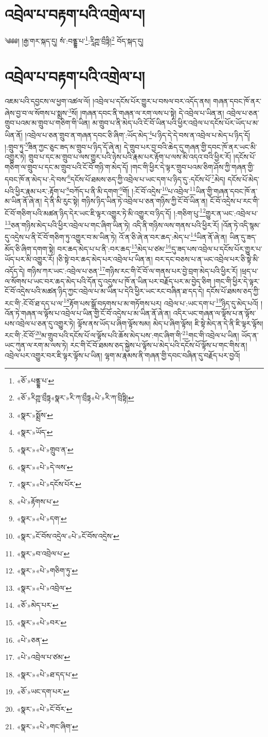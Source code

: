 \chapter{འབྲེལ་པ་བརྟག་པའི་འགྲེལ་པ།}༄༅༅། །རྒྱ་གར་སྐད་དུ། སཾ་:བནྡྷ་པ་\footnote{«ཅོ་»པནྡྷ་པ་}:རཱིཀྵ་བྲྀཏྟི།\footnote{«ཅོ་»རིཀྵ་བྲྀཏྟ«སྣར་»རི་ཀ་བྲྀཏྟ«པེ་»རི་ཀ་བྲིཏྟི།} བོད་སྐད་དུ། \chapter{འབྲེལ་པ་བརྟག་པའི་འགྲེལ་པ།} འཇམ་པའི་དབྱངས་ལ་ཕྱག་འཚལ་ལོ། །འབྲེལ་པ་དངོས་པོར་གྱུར་པ་བསལ་བར་འདོད་ནས། གཞན་དབང་ཁོ་ནར་ཞེས་བྱ་བ་ལ་སོགས་པ་སྨྲས་\footnote{«སྣར་»སྨྲོས་}སོ། །གཞན་དབང་ནི་གཞན་ལ་རག་ལས་པ་སྟེ། དེ་འབྲེལ་པ་ཡིན་ན། འབྲེལ་པ་ཅན་གྲུབ་པའམ་མ་གྲུབ་པ་གཅིག་གི་ཡིན། མ་གྲུབ་པ་ནི་མེད་པའི་ངོ་བོ་ཡིན་པའི་ཕྱིར་འབྲེལ་པ་དངོས་པོར་ཡོད་པ་མ་ཡིན་ནོ། །འབྲེལ་པ་ཅན་གྲུབ་ན་གཞན་དབང་ཅི་ཞིག་:ཡོད་མེད་\footnote{«སྣར་»ཡོད་}པ་ཉིད་དེ་དེ་བས་ན་འབྲེལ་པ་མེད་པ་ཉིད་དོ། །:གྲུབ་ཏུ་\footnote{«སྣར་»«པེ་»གྲུབ་ན་}ཟིན་ཀྱང་ཅུང་ཟད་མ་གྲུབ་པ་ཉིད་དོ་ཞེ་ན། དེ་གྲུབ་པར་བྱ་བའི་ཆེད་དུ་གཞན་གྱི་དབང་ཁོ་ནར་ཡང་མི་འགྱུར་ཏེ། གྲུབ་པ་དང་མ་གྲུབ་པ་ལས་གྱུར་པའི་ཉེས་པའི་རྣམ་པར་རྟོག་པ་ལས་མི་འདའ་བའི་ཕྱིར་རོ། །དངོས་པོ་གཅིག་ལ་གྲུབ་པ་དང་མ་གྲུབ་པའི་ངོ་བོ་གཉི་ག་མེད་དོ། །གང་གི་ཕྱིར་དེ་ལྟར་གྲུབ་པའམ་ཅིག་ཤོས་ཀྱི་གཞན་གྱི་དབང་ཁོ་ན་མེད་པ་:དེ་བས་\footnote{«སྣར་»«པེ་»དེ་ལས་}དངོས་པོ་ཐམས་ཅད་ཀྱི་འབྲེལ་པ་ཡང་དག་པ་ཉིད་དུ་:དངོས་པོ་\footnote{«སྣར་»«པེ་»དངོས་པོར་}མེད། དངོས་པོ་མེད་པའི་ཕྱིར་རྣམ་པར་:རྟོག་པ་\footnote{«པེ་»རྟོགས་པ་}བཀོད་པ་ནི་མི་དགག་\footnote{«སྣར་»«པེ་»དག་}གོ། །:ངོ་བོ་འདྲེས་\footnote{«སྣར་»ངོ་བོས་འདྲེལ་«པེ་»ངོ་བོས་འདྲེས་}པ་འབྲེལ་\footnote{«སྣར་»བ་འབྲེལ་པ་}ཡིན་གྱི་གཞན་དབང་ཁོ་ན་མ་ཡིན་ནོ་ཞེ་ན། དེ་ནི་མི་རུང་སྟེ། གཉིས་ཉིད་ཡིན་ཏེ་འབྲེལ་པ་ཅན་གཉིས་ཀྱི་ངོ་བོ་ཡིན་ན། ངོ་བོ་འདྲེས་པ་རང་གི་ངོ་བོ་གཅིག་པའི་མཚན་ཉིད་དེར་ཡང་ཇི་ལྟར་འགྱུར་ཏེ་མི་འགྱུར་བ་ཉིད་དོ། །:གཅིག་པུ་\footnote{«སྣར་»«པེ་»གཅིག་ཏུ་}གྱུར་ན་ཡང་:འབྲེལ་པ་\footnote{«སྣར་»«པེ་»འབྲེལ་}ཅན་གཉིས་མེད་པའི་ཕྱིར་འབྲེལ་པ་གང་ཞིག་ཡིན་ཏེ། འདི་ནི་གཉིས་ལས་གནས་པའི་ཕྱིར་རོ། །འོན་ཏེ་འདི་སྙམ་དུ་འདྲེས་པ་ནི་ངོ་བོ་གཅིག་ཏུ་འགྱུར་བ་མ་ཡིན་ཏེ། འོ་ན་ཅི་ཞེ་ན་བར་ཆད་:མེད་པ་\footnote{«ཅོ་»མེད་པར་}ཡིན་ནོ་ཞེ་ན། ཡིན་དུ་ཟད་མོད་ཅི་ཞིག་དགག་སྟེ། བར་ཆད་མེད་པ་པ་ནི་:བར་ཆད་\footnote{«སྣར་»«པེ་»བར་}མེད་པ་ཙམ་\footnote{«པེ་»ཅན་}དུ་ཟད་པས་འབྲེལ་པ་དངོས་པོར་གྱུར་པ་ཡོད་པར་མི་འགྱུར་རོ། །ཅི་སྟེ་བར་ཆད་མེད་པར་འབྲེལ་པ་ཡིན་ན། བར་དང་བཅས་པ་ན་ཡང་འབྲེལ་པར་ཅི་སྟེ་མི་འདོད་དེ། གཉིས་ཀར་ཡང་:འབྲེལ་པ་ཅན་\footnote{«པེ་»འབྲེལ་པ་ཙམ་}གཉིས་རང་གི་ངོ་བོ་ལ་གནས་པར་བྱེ་བྲག་མེད་པའི་ཕྱིར་རོ། །ཕྲད་པ་ལ་སོགས་པ་ཡང་བར་ཆད་མེད་པའི་དོན་དུ་འདུས་པ་ཁོ་ན་ཡིན་པར་བརྗོད་པར་མ་བྱེད་ཅིག །གང་གི་ཕྱིར་དེ་ལྟར་ངོ་བོ་འདྲེས་པའི་མཚན་ཉིད་ཀྱང་འབྲེལ་པ་མ་ཡིན་པ་དེའི་ཕྱིར་ཡང་རང་བཞིན་ཐ་དད་དེ། དངོས་པོ་ཐམས་ཅད་ཀྱི་རང་གི་:ངོ་བོ་ཐ་དད་པ་ལ་\footnote{«སྣར་»«པེ་»ཐ་དད་པ་}རྟོག་པས་སྒྲོ་བཏགས་པ་མ་གཏོགས་པར། འབྲེལ་པ་:ཡང་དག་པ་\footnote{«ཅོ་»ཡང་དག་པར་}ཉིད་དུ་མེད་པའོ། །འོན་ཏེ་གཞན་ལ་ལྟོས་པ་འབྲེལ་པ་ཡིན་གྱི་ངོ་བོ་འདྲེས་པ་མ་ཡིན་ནོ་ཞེ་ན། འདིར་ཡང་གཞན་ལ་ལྟོས་པ་ན་ལྟོས་པས་འབྲེལ་པ་ཅན་དུ་འགྱུར་ཏེ། ལྟོས་ནས་ཡོད་པ་ཞིག་ལྟོས་སམ། མེད་པ་ཞིག་ལྟོས། ཇི་སྟེ་མེད་ན་དེ་ནི་ཇི་ལྟར་ལྟོས། རང་གི་:ངོ་བོ་\footnote{«སྣར་»«པེ་»ངོ་བོར་}མ་གྲུབ་པའི་དངོས་པོ་ལ་ལྟོས་པའི་ཆོས་མེད་པས་:གང་ཞིག་གི་\footnote{«སྣར་»«པེ་»གང་ཞིག་}གང་གི་འབྲེལ་པ་ཡིན། ཡོད་ན་ཡང་ཀུན་ལ་རག་མ་ལས་ཏེ། རང་གི་ངོ་བོ་ཐམས་ཅད་སྐྱེས་པ་ལྟོས་པ་མེད་པའི་དངོས་པོ་ལྟོས་པ་གང་གིས་ན། འབྲེལ་པར་འགྱུར་བར་ཇི་ལྟར་ལྟོས་པ་ཡིན། ལྷག་མ་རྣམས་ནི་གཞན་གྱི་དབང་བཞིན་དུ་བརྗོད་པར་བྱའོ། 